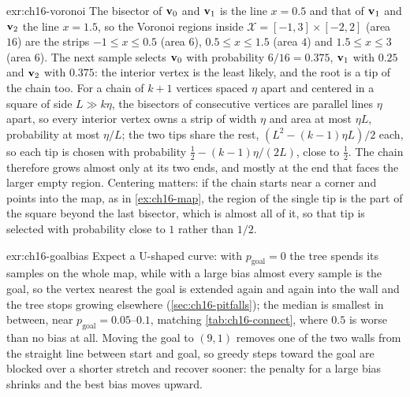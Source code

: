 \begin{solution}{exr:ch16-voronoi}
The bisector of $\mathbf{v}_0$ and $\mathbf{v}_1$ is the line $x=0.5$ and that of $\mathbf{v}_1$ and $\mathbf{v}_2$ the line $x=1.5$, so the Voronoi regions inside $\mathcal{X}=[-1,3]\times[-2,2]$ (area $16$) are the strips $-1\le x\le0.5$ (area $6$), $0.5\le x\le1.5$ (area $4$) and $1.5\le x\le3$ (area $6$). The next sample selects $\mathbf{v}_0$ with probability $6/16=0.375$, $\mathbf{v}_1$ with $0.25$ and $\mathbf{v}_2$ with $0.375$: the interior vertex is the least likely, and the root is a tip of the chain too. For a chain of $k+1$ vertices spaced $\eta$ apart and centered in a square of side $L\gg k\eta$, the bisectors of consecutive vertices are parallel lines $\eta$ apart, so every interior vertex owns a strip of width $\eta$ and area at most $\eta L$, probability at most $\eta/L$; the two tips share the rest, $(L^{2}-(k-1)\eta L)/2$ each, so each tip is chosen with probability $\tfrac12-(k-1)\eta/(2L)$, close to $\tfrac12$. The chain therefore grows almost only at its two ends, and mostly at the end that faces the larger empty region. Centering matters: if the chain starts near a corner and points into the map, as in \cref{ex:ch16-map}, the region of the single tip is the part of the square beyond the last bisector, which is almost all of it, so that tip is selected with probability close to $1$ rather than $1/2$.
\end{solution}

\begin{solution}{exr:ch16-goalbias}
Expect a U-shaped curve: with $p_{\mathrm{goal}}=0$ the tree spends its samples on the whole map, while with a large bias almost every sample is the goal, so the vertex nearest the goal is extended again and again into the wall and the tree stops growing elsewhere (\cref{sec:ch16-pitfalls}); the median is smallest in between, near $p_{\mathrm{goal}}=0.05$--$0.1$, matching \cref{tab:ch16-connect}, where $0.5$ is worse than no bias at all. Moving the goal to $(9,1)$ removes one of the two walls from the straight line between start and goal, so greedy steps toward the goal are blocked over a shorter stretch and recover sooner: the penalty for a large bias shrinks and the best bias moves upward.
\end{solution}

